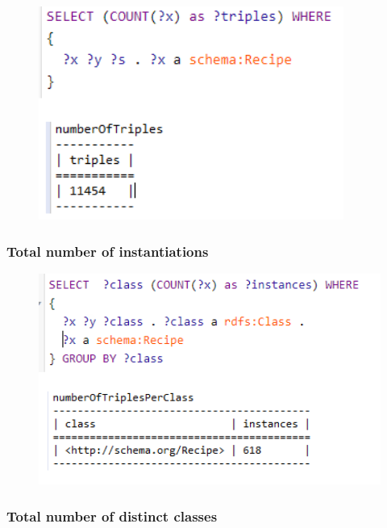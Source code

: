 \documentclass{article}
\begin{document}
\begin{figure}[H]
  \centering
  \includegraphics[width=10cm]{pictures/res1_triples.png}
  \label{fig:qures1}
\end{figure}

\subsubsection{Total number of instantiations}

\begin{figure}[H]
  \centering
  \includegraphics[width=12cm]{pictures/res2_instantiations.png}
  \label{fig:qures2}
\end{figure}

\subsubsection{Total number of distinct classes}
\end{document}
